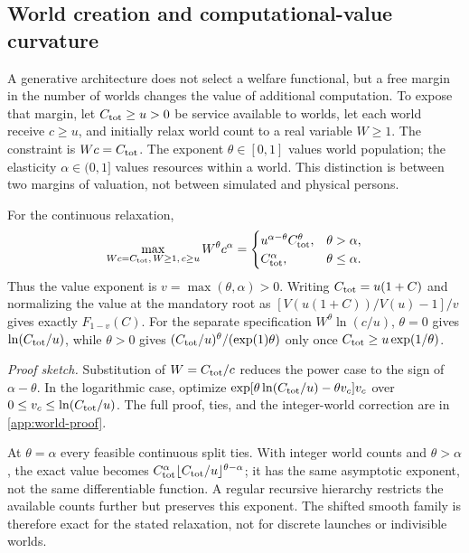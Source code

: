 \subsection{World creation and computational-value curvature}
\label{sec:world-value}
A generative architecture does not select a welfare functional, but a free
margin in the number of worlds changes the value of additional computation.
To expose that margin, let $C_{\rm tot}\geq u>0$ be service available to
worlds, let each world receive $c\geq u$, and initially relax world count
to a real variable $W\geq1$. The constraint is $Wc=C_{\rm tot}$. The
exponent $\theta\in[0,1]$ values world population; the elasticity
$\alpha\in(0,1]$ values resources within a world. This distinction is
between two margins of valuation, not between simulated and physical
persons.

\begin{lemma}
\label{lem:world-curvature}
For the continuous relaxation,
\begin{equation}
 \max_{Wc=C_{\rm tot},\,W\geq1,\,c\geq u}W^\theta c^\alpha
 =\begin{cases}
 u^{\alpha-\theta}C_{\rm tot}^{\theta},&\theta>\alpha,\\
 C_{\rm tot}^{\alpha},&\theta\leq\alpha.
 \end{cases}
 \label{eq:world-value}
\end{equation}
Thus the value exponent is $v=\max(\theta,\alpha)>0$. Writing
$C_{\rm tot}=u(1+C)$ and normalizing the value at the mandatory root
as $[V(u(1+C))/V(u)-1]/v$ gives exactly $F_{1-v}(C)$.
For the separate specification $W^\theta\ln(c/u)$, $\theta=0$ gives
$\ln(C_{\rm tot}/u)$, while $\theta>0$ gives
$(C_{\rm tot}/u)^\theta/(\exp(1)\theta)$ only once
$C_{\rm tot}\geq u\exp(1/\theta)$.
\end{lemma}
\noindent\emph{Proof sketch.}
Substitution of $W=C_{\rm tot}/c$ reduces the power case to the sign
of $\alpha-\theta$. In the logarithmic case, optimize
$\exp[\theta\ln(C_{\rm tot}/u)-\theta v_c]v_c$ over
$0\leq v_c\leq\ln(C_{\rm tot}/u)$. The full proof, ties, and the
integer-world correction are in \cref{app:world-proof}.

At $\theta=\alpha$ every feasible continuous split ties. With integer
world counts and $\theta>\alpha$, the exact value becomes
$C_{\rm tot}^\alpha\lfloor C_{\rm tot}/u\rfloor^{\theta-\alpha}$;
it has the same asymptotic exponent, not the same differentiable function.
A regular recursive hierarchy restricts the available counts further but
preserves this exponent. The shifted smooth family is therefore exact for
the stated relaxation, not for discrete launches or indivisible worlds.

